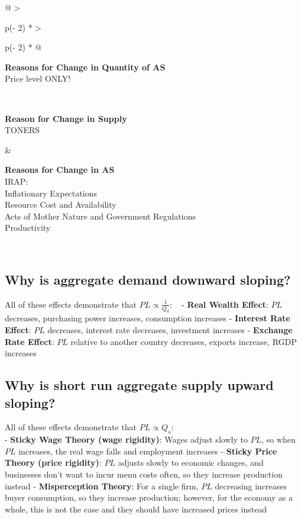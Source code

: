 \documentclass[
  letterpaper,
  DIV=11,
  numbers=noendperiod]{scrartcl}
\begin{document}
\begin{longtable}[]{@{}
  >{\raggedright\arraybackslash}p{(\columnwidth - 2\tabcolsep) * }
  >{\raggedright\arraybackslash}p{(\columnwidth - 2\tabcolsep) * }@{}}
\begin{minipage}[t]{\linewidth}
\textbf{Reasons for Change in Quantity of AS}\\
Price level ONLY!\strut
\end{minipage} \\
\begin{minipage}[t]{\linewidth}\raggedright
\textbf{Reason for Change in Supply}\\
TONERS\strut
\end{minipage} & \begin{minipage}[t]{\linewidth}\raggedright
\textbf{Reasons for Change in AS}\\
IRAP:\\
Inflationary Expectations\\
Resource Cost and Availability\\
Acts of Mother Nature and Government Regulations\\
Productivity\strut
\end{minipage} \\
\end{longtable}

\subsection{Why is aggregate demand downward
sloping?}\label{why-is-aggregate-demand-downward-sloping}

All of these effects demonstrate that \(PL \propto \frac{1}{Q_d}\): ~ -
\textbf{Real Wealth Effect}: \(PL\) decreases, purchasing power
increases, consumption increases - \textbf{Interest Rate Effect}: \(PL\)
decreases, interest rate decreases, investment increases -
\textbf{Exchange Rate Effect}: \(PL\) relative to another country
decreases, exports increase, RGDP increases

\subsection{Why is short run aggregate supply upward
sloping?}\label{why-is-short-run-aggregate-supply-upward-sloping}

All of these effects demonstrate that \(PL \propto Q_s\):\\
- \textbf{Sticky Wage Theory (wage rigidity)}: Wages adjust slowly to
\(PL\), so when \(PL\) increases, the real wage falls and employment
increases - \textbf{Sticky Price Theory (price rigidity)}: \(PL\)
adjusts slowly to economic changes, and businesses don't want to incur
menu costs often, so they increase production instead -
\textbf{Misperception Theory}: For a single firm, \(PL\) decreasing
increases buyer consumption, so they increase production; however, for
the economy as a whole, this is not the case and they should have
increased prices instead
\end{document}
